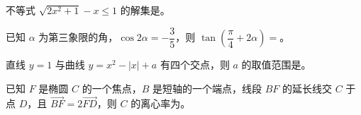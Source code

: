 \begin{question}
不等式 $\sqrt{2x^2+1}-x\leq1$ 的解集是\gkblank{}。

\end{question}
\begin{question}
已知 $\alpha$ 为第三象限的角，$\cos2\alpha=-\dfrac35$，则 $\tan\left(\dfrac\pi4+2\alpha\right)=$\gkblank{}。

\end{question}
\begin{question}
直线 $y=1$ 与曲线 $y=x^2-|x|+a$ 有四个交点，则 $a$ 的取值范围是\gkblank{}。

\end{question}
\begin{question}
已知 $F$ 是椭圆 $C$ 的一个焦点，$B$ 是短轴的一个端点，线段 $BF$ 的延长线交 $C$ 于点 $D$，且 $\overrightarrow{BF}=2\overrightarrow{FD}$，则 $C$ 的离心率为\gkblank{}。

\end{question}

